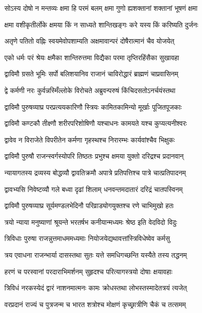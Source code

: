 \twolineshloka
{सोऽस्य दोषो न मन्तव्यः क्षमा हि परमं बलम्}
{क्षमा गुणो ह्यशक्तानां शक्तानां भूषणं क्षमा}


\twolineshloka
{क्षमा वशीकृतीर्लोके क्षमया किं न साध्यते}
{शान्तिखङ्गः करे यस्य किं करिष्यति दुर्जनः}


\twolineshloka
{अतृणे पतितो वह्निः स्वयमेवोपशाम्यति}
{अक्षमावान्परं दोषैरात्मानं चैव योजयेत्}


\twolineshloka
{एको धर्मः परं श्रेयः क्षमैका शान्तिरुत्तमा}
{विद्यैका परमा तृप्तिरहिंसैका सुखावहा}


\twolineshloka
{द्वाविमौ ग्रसते भूमिः सर्पो बलिशयानिव}
{राजानं चाविरोद्धारं ब्राह्मणं चाप्रवासिनम्}


\twolineshloka
{द्वे कर्मणी नरः कुर्वन्नस्मिँल्लोके विरोचते}
{अब्रुवन्परुषं किंचिदसतोऽनर्चयंस्तथा}


\twolineshloka
{द्वाविमौ पुरुषव्याघ्र परप्रत्ययकारिणौ}
{स्त्रियः कामितकामिन्यो मूर्खाः पूजितपूजकाः}


\twolineshloka
{द्वाविमौ कण्टकौ तीक्ष्णौ शरीरपरिशोषिणौ}
{यश्चाधनः कामयते यश्च कुप्यत्यनीश्वरः}


\twolineshloka
{द्वावेव न विराजेते विपरीतेन कर्मणा}
{गृहस्थश्च निरारम्भः कार्यवांश्चैव भिक्षुकः}


\twolineshloka
{द्वाविमौ पुरुषौ राजन्स्वर्गस्योपरि तिष्ठतः}
{प्रभुश्च क्षमया युक्तो दरिद्रश्च प्रदानवान्}


\twolineshloka
{न्यायागतस्य द्रव्यस्य बोद्धव्यौ द्वावतिक्रमौ}
{अपात्रे प्रतिपत्तिश्च पात्रे चात्प्रतिपादनम्}


\twolineshloka
{द्वावभ्यसि निवेष्टव्यौ गले बध्वा दृढां शिलाम्}
{धनवन्तमदातारं दरिद्रं चातपस्विनम्}


\twolineshloka
{द्वाविमौ पुरुषव्याघ्र सूर्यमण्डलभेदिनौ}
{परिव्राड्योगयुक्तश्च रणे चाभिमुखो हतः}


\twolineshloka
{त्रयो न्याया मनुष्याणां श्रूयन्ते भरतर्षभ}
{कनीयान्मध्यमः श्रेष्ठ इति वेदविदो विदुः}


\twolineshloka
{त्रिविधाः पुरुषा राजन्नुत्तमाधममध्यमाः}
{नियोजयेद्यथावत्तांस्त्रिविधेष्वेव कर्मसु}


\twolineshloka
{त्रय एवाधना राजन्भार्या दासस्तथा सुतः}
{यत्ते समधिगच्छन्ति यस्यैते तस्य तद्धनम्}


\twolineshloka
{हरणं च परस्वानां परदाराभिमर्शनम्}
{सुहृदश्च परित्यागस्त्रयो दोषाः क्षयावहाः}


\twolineshloka
{त्रिविधं नरकस्येदं द्वारं नाशनमात्मनः}
{कामः क्रोधस्तथा लोभस्तस्मादेतत्रयं त्यजेत्}


\twolineshloka
{वरप्रदानं राज्यं च पुत्रजन्म च भारत}
{शत्रोश्च मोक्षणं कृच्छ्रात्रीणि चैकं च तत्समम्}


